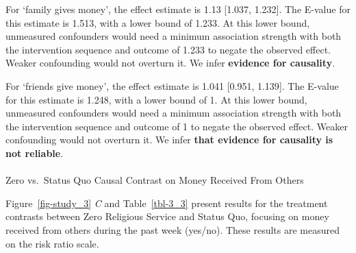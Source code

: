 \documentclass[
  single column]{article}
\makeatletter
\let\oldparagraph\paragraph
\renewcommand{\paragraph}{
    \@ifstar
      \xxxParagraphStar
      \xxxParagraphNoStar
  }
\newcommand{\xxxParagraphStar}[1]{\oldparagraph*{#1}\mbox{}}
\newcommand{\xxxParagraphNoStar}[1]{\oldparagraph{#1}\mbox{}}
\makeatother
\begin{document}
For `family gives money', the effect estimate is 1.13 {[}1.037,
1.232{]}. The E-value for this estimate is 1.513, with a lower bound of
1.233. At this lower bound, unmeasured confounders would need a minimum
association strength with both the intervention sequence and outcome of
1.233 to negate the observed effect. Weaker confounding would not
overturn it. We infer \textbf{evidence for causality}.

For `friends give money', the effect estimate is 1.041 {[}0.951,
1.139{]}. The E-value for this estimate is 1.248, with a lower bound of
1. At this lower bound, unmeasured confounders would need a minimum
association strength with both the intervention sequence and outcome of
1 to negate the observed effect. Weaker confounding would not overturn
it. We infer \textbf{that evidence for causality is not reliable}.

\paragraph{Zero vs.~Status Quo Causal Contrast on Money Received From
Others}\label{zero-vs.-status-quo-causal-contrast-on-money-received-from-others}

Figure~\ref{fig-study_3} \emph{C} and Table~\ref{tbl-3_3} present
results for the treatment contrasts between Zero Religious Service and
Status Quo, focusing on money received from others during the past week
(yes/no). These results are measured on the risk ratio scale.
\end{document}
